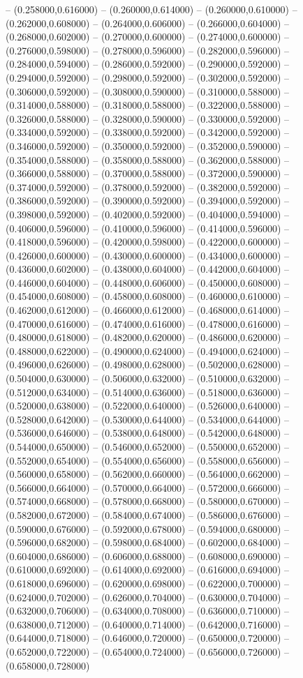 -- (0.258000,0.616000) -- (0.260000,0.614000) -- (0.260000,0.610000) -- (0.262000,0.608000) -- (0.264000,0.606000) -- (0.266000,0.604000) -- (0.268000,0.602000) -- (0.270000,0.600000) -- (0.274000,0.600000) -- (0.276000,0.598000) -- (0.278000,0.596000) -- (0.282000,0.596000) -- (0.284000,0.594000) -- (0.286000,0.592000) -- (0.290000,0.592000) -- (0.294000,0.592000) -- (0.298000,0.592000) -- (0.302000,0.592000) -- (0.306000,0.592000) -- (0.308000,0.590000) -- (0.310000,0.588000) -- (0.314000,0.588000) -- (0.318000,0.588000) -- (0.322000,0.588000) -- (0.326000,0.588000) -- (0.328000,0.590000) -- (0.330000,0.592000) -- (0.334000,0.592000) -- (0.338000,0.592000) -- (0.342000,0.592000) -- (0.346000,0.592000) -- (0.350000,0.592000) -- (0.352000,0.590000) -- (0.354000,0.588000) -- (0.358000,0.588000) -- (0.362000,0.588000) -- (0.366000,0.588000) -- (0.370000,0.588000) -- (0.372000,0.590000) -- (0.374000,0.592000) -- (0.378000,0.592000) -- (0.382000,0.592000) -- (0.386000,0.592000) -- (0.390000,0.592000) -- (0.394000,0.592000) -- (0.398000,0.592000) -- (0.402000,0.592000) -- (0.404000,0.594000) -- (0.406000,0.596000) -- (0.410000,0.596000) -- (0.414000,0.596000) -- (0.418000,0.596000) -- (0.420000,0.598000) -- (0.422000,0.600000) -- (0.426000,0.600000) -- (0.430000,0.600000) -- (0.434000,0.600000) -- (0.436000,0.602000) -- (0.438000,0.604000) -- (0.442000,0.604000) -- (0.446000,0.604000) -- (0.448000,0.606000) -- (0.450000,0.608000) -- (0.454000,0.608000) -- (0.458000,0.608000) -- (0.460000,0.610000) -- (0.462000,0.612000) -- (0.466000,0.612000) -- (0.468000,0.614000) -- (0.470000,0.616000) -- (0.474000,0.616000) -- (0.478000,0.616000) -- (0.480000,0.618000) -- (0.482000,0.620000) -- (0.486000,0.620000) -- (0.488000,0.622000) -- (0.490000,0.624000) -- (0.494000,0.624000) -- (0.496000,0.626000) -- (0.498000,0.628000) -- (0.502000,0.628000) -- (0.504000,0.630000) -- (0.506000,0.632000) -- (0.510000,0.632000) -- (0.512000,0.634000) -- (0.514000,0.636000) -- (0.518000,0.636000) -- (0.520000,0.638000) -- (0.522000,0.640000) -- (0.526000,0.640000) -- (0.528000,0.642000) -- (0.530000,0.644000) -- (0.534000,0.644000) -- (0.536000,0.646000) -- (0.538000,0.648000) -- (0.542000,0.648000) -- (0.544000,0.650000) -- (0.546000,0.652000) -- (0.550000,0.652000) -- (0.552000,0.654000) -- (0.554000,0.656000) -- (0.558000,0.656000) -- (0.560000,0.658000) -- (0.562000,0.660000) -- (0.564000,0.662000) -- (0.566000,0.664000) -- (0.570000,0.664000) -- (0.572000,0.666000) -- (0.574000,0.668000) -- (0.578000,0.668000) -- (0.580000,0.670000) -- (0.582000,0.672000) -- (0.584000,0.674000) -- (0.586000,0.676000) -- (0.590000,0.676000) -- (0.592000,0.678000) -- (0.594000,0.680000) -- (0.596000,0.682000) -- (0.598000,0.684000) -- (0.602000,0.684000) -- (0.604000,0.686000) -- (0.606000,0.688000) -- (0.608000,0.690000) -- (0.610000,0.692000) -- (0.614000,0.692000) -- (0.616000,0.694000) -- (0.618000,0.696000) -- (0.620000,0.698000) -- (0.622000,0.700000) -- (0.624000,0.702000) -- (0.626000,0.704000) -- (0.630000,0.704000) -- (0.632000,0.706000) -- (0.634000,0.708000) -- (0.636000,0.710000) -- (0.638000,0.712000) -- (0.640000,0.714000) -- (0.642000,0.716000) -- (0.644000,0.718000) -- (0.646000,0.720000) -- (0.650000,0.720000) -- (0.652000,0.722000) -- (0.654000,0.724000) -- (0.656000,0.726000) -- (0.658000,0.728000) 
